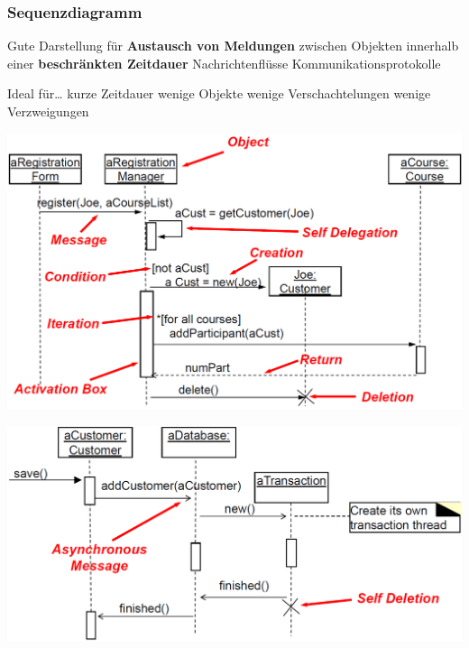 \subsubsection{Sequenzdiagramm}
\label{Sequenzdiagramm}

\begin{minipage}[t]{0.48\columnwidth}
    \begin{outline}
        \1 Gute Darstellung für \textbf{Austausch von Meldungen} zwischen Objekten innerhalb einer \textbf{beschränkten Zeitdauer}
            \2 Nachrichtenflüsse
            \2 Kommunikationsprotokolle
    \end{outline}
\end{minipage}
\hfill
\begin{minipage}[t]{0.48\columnwidth}
    \begin{outline}
        \1 Ideal für\ldots
            \2 kurze Zeitdauer
            \2 wenige Objekte
            \2 wenige Verschachtelungen
            \2 wenige Verzweigungen
    \end{outline}
\end{minipage}


\begin{center}
    \includegraphics[width=0.9\columnwidth]{images/sequenzdiagramm_elemente_1.png}

    \vspace{0.3cm}

    \includegraphics[width=0.9\columnwidth]{images/sequenzdiagramm_elemente_2.png}
\end{center}


